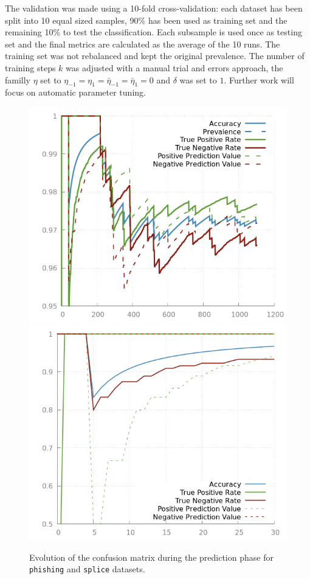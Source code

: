 \documentclass[preprint,12pt]{elsarticle}
\theoremstyle{definition}
\begin{document}
The validation was made using a 10-fold cross-validation: each dataset has been split into 10 equal sized samples, 90\% has been used as training set and the remaining 10\% to test the classification. Each subsample is used once as testing set and the final metrics are calculated as the average of the 10 runs. The training set was not rebalanced and kept the original prevalence. The number of training steps $k$ was adjusted with a manual trial and errors approach, the familly $\eta$ set to $\eta_{-1} = \eta_1 = \bar \eta_{-1} = \bar \eta_1 = 0$ and $\delta$ was set to $1$. Further work will focus on automatic parameter tuning. 
\begin{figure}[!h]
\centering
\includegraphics[scale=0.3]{img/output_run_0_confusion_matrix_1.png}
\includegraphics[scale=0.3]{img/splice_output_run_0_confusion_matrix_1.png}
\caption{Evolution of the confusion matrix during the prediction phase for \texttt{phishing} and \texttt{splice} datasets.}
\label{fig:evolution_phishing}
\end{figure}
\end{document}
